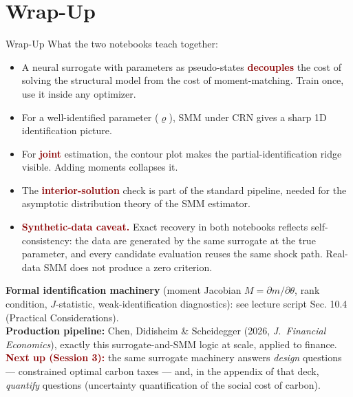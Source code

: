 \documentclass[10pt,aspectratio=169]{beamer}
\newcommand{\emphc}[1]{\textbf{\textcolor{darkred}{#1}}}
\begin{document}
\section{Wrap-Up}

\begin{frame}[shrink=5]{Wrap-Up}
\small
What the two notebooks teach together:
\begin{itemize}
\itemsep1pt
  \item A neural surrogate with parameters as pseudo-states \emphc{decouples} the cost of solving the structural model from the cost of moment-matching. Train once, use it inside any optimizer.
  \item For a well-identified parameter ($\varrho$), SMM under CRN gives a sharp 1D identification picture.
  \item For \emphc{joint} estimation, the contour plot makes the partial-identification ridge visible. Adding moments collapses it.
  \item The \emphc{interior-solution} check is part of the standard pipeline, needed for the asymptotic distribution theory of the SMM estimator.
  \item \emphc{Synthetic-data caveat.} Exact recovery in both notebooks reflects self-consistency: the data are generated by the same surrogate at the true parameter, and every candidate evaluation reuses the same shock path. Real-data SMM does not produce a zero criterion.
\end{itemize}
\vspace{0.10cm}
{\footnotesize \textbf{Formal identification machinery} (moment Jacobian $M = \partial m/\partial\theta$, rank condition, $J$-statistic, weak-identification diagnostics): see lecture script Sec. 10.4 (Practical Considerations).}
\vspace{0.10cm}\\
\textbf{Production pipeline:} Chen, Didisheim \& Scheidegger (2026, \emph{J.\ Financial Economics}), exactly this surrogate-and-SMM logic at scale, applied to finance.
\vspace{0.10cm}\\
\emphc{Next up (Session 3):} the same surrogate machinery answers \emph{design} questions --- constrained optimal carbon taxes --- and, in the appendix of that deck, \emph{quantify} questions (uncertainty quantification of the social cost of carbon).
\end{frame}
\end{document}
